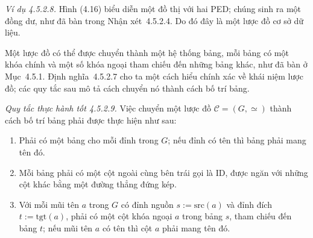 \noindent\textit{Ví dụ 4.5.2.8.}\keepwithnext
Hình (4.16) biểu diễn một đồ thị với hai PED; chúng sinh ra một đồng dư, như đã bàn trong Nhận xét~4.5.2.4. Do đó đây là một lược đồ cơ sở dữ liệu.

Một lược đồ có thể được chuyển thành một hệ thống bảng, mỗi bảng có một khóa chính và một số khóa ngoại tham chiếu đến những bảng khác, như đã bàn ở Mục~4.5.1. Định nghĩa~4.5.2.7 cho ta một cách hiểu chính xác về khái niệm lược đồ; các quy tắc sau mô tả cách chuyển nó thành cách bố trí bảng.

\noindent\textit{Quy tắc thực hành tốt 4.5.2.9.}\keepwithnext
Việc chuyển một lược đồ $\mathcal C=(G,\simeq)$ thành cách bố trí bảng phải được thực hiện như sau:
\begin{enumerate}[label=(\roman*)]
\item Phải có một bảng cho mỗi đỉnh trong $G$; nếu đỉnh có tên thì bảng phải mang tên đó.
\item Mỗi bảng phải có một cột ngoài cùng bên trái gọi là ID, được ngăn với những cột khác bằng một đường thẳng đứng kép.
\item Với mỗi mũi tên $a$ trong $G$ có đỉnh nguồn $s:=\mathrm{src}(a)$ và đỉnh đích $t:=\mathrm{tgt}(a)$, phải có một cột khóa ngoại $a$ trong bảng $s$, tham chiếu đến bảng $t$; nếu mũi tên $a$ có tên thì cột $a$ phải mang tên đó.
\end{enumerate}

